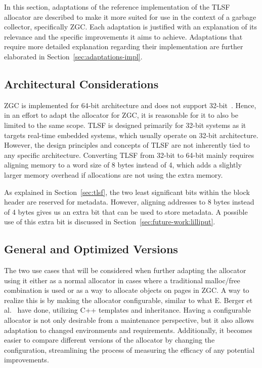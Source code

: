 
In this section, adaptations of the reference implementation of the TLSF allocator are described to make it more suited for use in the context of a garbage collector, specifically ZGC. Each adaptation is justified with an explanation of its relevance and the specific improvements it aims to achieve. Adaptations that require more detailed explanation regarding their implementation are further elaborated in Section~\ref{sec:adaptations-impl}.

\subsection{Architectural Considerations}
\label{sec:adaptations:architectural-considerations}

ZGC is implemented for 64-bit architecture and does not support 32-bit~\cite{zgc_deep_dive}. Hence, in an effort to adapt the allocator for ZGC, it is reasonable for it to also be limited to the same scope. TLSF is designed primarily for 32-bit systems as it targets real-time embedded systems, which usually operate on 32-bit architecture. However, the design principles and concepts of TLSF are not inherently tied to any specific architecture. Converting TLSF from 32-bit to 64-bit mainly requires aligning memory to a word size of 8 bytes instead of 4, which adds a slightly larger memory overhead if allocations are not using the extra memory.

As explained in Section~\ref{sec:tlsf}, the two least significant bits within the block header are reserved for metadata. However,  aligning addresses to 8 bytes instead of 4 bytes gives us an extra bit that can be used to store metadata. A possible use of this extra bit is discussed in Section~\ref{sec:future-work:lilliput}.

\subsection{General and Optimized Versions}

The two use cases that will be considered when further adapting the allocator using it either as a normal allocator in cases where a traditional malloc/free combination is used or as a way to allocate objects on pages in ZGC. A way to realize this is by making the allocator configurable, similar to what E. Berger et al.~\cite{configurable_allocator} have done, utilizing C++ templates and inheritance. Having a configurable allocator is not only desirable from a maintenance perspective, but it also allows adaptation to changed environments and requirements. Additionally, it becomes easier to compare different versions of the allocator by changing the configuration, streamlining the process of measuring the efficacy of any potential improvements.

